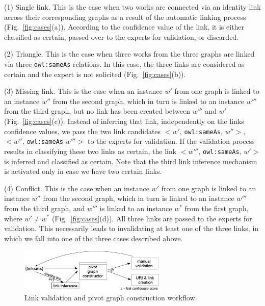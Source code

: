 (1) Single link. This is the case when two works are connected via an identity link across their corresponding graphs as a result of the automatic linking process (Fig.~\ref{fig:cases}(a)). According to the confidence value of the link, it is either classified as  certain, passed over to the experts for validation, or discarded.

(2) Triangle. This is the case when three works from the three graphs are linked via three {\tt owl:sameAs} relations. In this case, the three links are considered as certain and the expert is not solicited (Fig.~\ref{fig:cases}(b)).

(3) Missing link. This is the case when an instance $w'$ from one graph is linked to an instance $w''$ from the second graph, which in turn is linked to an instance $w'''$ from the third graph, but no link has been created between $w'''$ and $w'$ (Fig.~\ref{fig:cases}(c)). Instead of inferring that link, independently on the links confidence values, we pass the two link candidates $<w'$, {\tt owl:sameAs}, $w'' >$, $<w''$, {\tt owl:sameAs} $w'''>$ to the experts for validation. If the validation process results in classifying these two links as certain, the link $<w'''$, {\tt owl:sameAs}, $w'>$ is inferred and classified as certain. Note that the third link inference mechanism is activated only in case we have two certain links.

(4) Conflict. This is the case when an instance $w'$ from one graph is linked to an instance $w''$ from the second graph, which in turn is linked to an instance $w'''$ from the third graph, and $w'''$ is linked to an instance $w^*$ from the first graph, where $w' \neq w^*$  (Fig.~\ref{fig:cases}(d)). All three links are passed to the experts for validation. This necessarily leads to invalidating at least one of the three links, in which we fall into one of the three cases described above.

\begin{figure} 
\center
	\includegraphics[width=7cm]{img/pivot-graph-2.png}
	\caption{Link validation and pivot graph construction workflow.}
	\label{fig:pivot}
\end{figure}

